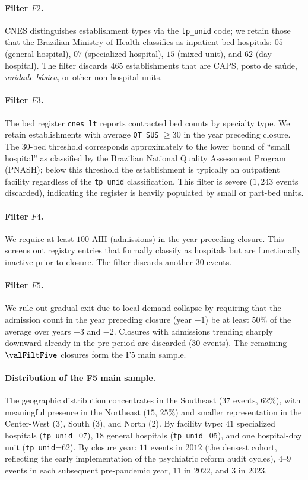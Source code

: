 \paragraph{Filter $F2$.} CNES distinguishes establishment types via the
\texttt{tp\_unid} code; we retain those that the Brazilian Ministry of
Health classifies as inpatient-bed hospitals: $05$ (general hospital),
$07$ (specialized hospital), $15$ (mixed unit), and $62$ (day hospital).
The filter discards $465$ establishments that are CAPS, posto de saúde,
\textit{unidade básica}, or other non-hospital units.

\paragraph{Filter $F3$.} The bed register \texttt{cnes\_lt} reports
contracted bed counts by specialty type. We retain establishments with
average \texttt{QT\_SUS} $\geq 30$ in the year preceding closure. The
$30$-bed threshold corresponds approximately to the lower bound of
``small hospital'' as classified by the Brazilian National Quality
Assessment Program (PNASH); below this threshold the establishment is
typically an outpatient facility regardless of the \texttt{tp\_unid}
classification. This filter is severe ($1{,}243$ events discarded),
indicating the register is heavily populated by small or part-bed
units.

\paragraph{Filter $F4$.} We require at least $100$ AIH (admissions) in
the year preceding closure. This screens out registry entries that
formally classify as hospitals but are functionally inactive prior to
closure. The filter discards another $30$ events.

\paragraph{Filter $F5$.} We rule out gradual exit due to local demand
collapse by requiring that the admission count in the year preceding
closure (year $-1$) be at least $50\%$ of the average over years $-3$
and $-2$. Closures with admissions trending sharply downward already
in the pre-period are discarded ($30$ events). The remaining $\valFiltFive$ closures form the F5 main sample.

\paragraph{Distribution of the F5 main sample.} The geographic
distribution concentrates in the Southeast ($37$ events, $62\%$), with
meaningful presence in the Northeast ($15$, $25\%$) and smaller
representation in the Center-West ($3$), South ($3$), and North ($2$).
By facility type: $41$ specialized hospitals (\texttt{tp\_unid}=07),
$18$ general hospitals (\texttt{tp\_unid}=05), and one hospital-day
unit (\texttt{tp\_unid}=62). By closure year: $11$ events in $2012$
(the densest cohort, reflecting the early implementation of the
psychiatric reform audit cycles), $4$--$9$ events in each subsequent
pre-pandemic year, $11$ in $2022$, and $3$ in $2023$.

